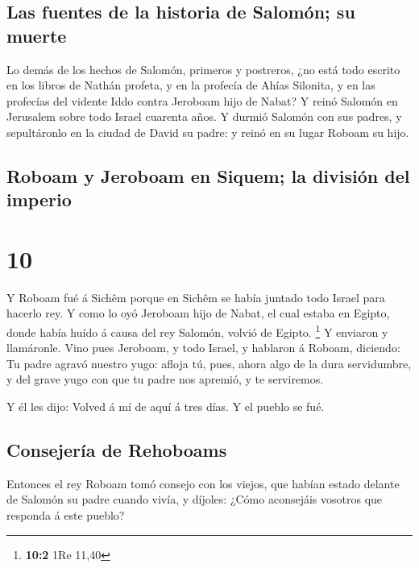 \hypertarget{las-fuentes-de-la-historia-de-salomuxf3n-su-muerte}{%
\subsection{Las fuentes de la historia de Salomón; su
muerte}\label{las-fuentes-de-la-historia-de-salomuxf3n-su-muerte}}

 Lo demás de los hechos de Salomón, primeros y postreros,
¿no está todo escrito en los libros de Nathán profeta, y en la profecía
de Ahías Silonita, y en las profecías del vidente Iddo contra Jeroboam
hijo de Nabat?  Y reinó Salomón en Jerusalem sobre todo
Israel cuarenta años.  Y durmió Salomón con sus padres, y
sepultáronlo en la ciudad de David su padre: y reinó en su lugar Roboam
su hijo.

\hypertarget{roboam-y-jeroboam-en-siquem-la-divisiuxf3n-del-imperio}{%
\subsection{Roboam y Jeroboam en Siquem; la división del
imperio}\label{roboam-y-jeroboam-en-siquem-la-divisiuxf3n-del-imperio}}

\hypertarget{section-9}{%
\section{10}\label{section-9}}

 Y Roboam fué á Sichêm porque en Sichêm se había juntado
todo Israel para hacerlo rey.  Y como lo oyó Jeroboam hijo
de Nabat, el cual estaba en Egipto, donde había huído á causa del rey
Salomón, volvió de Egipto. \footnote{\textbf{10:2} 1Re 11,40}
 Y enviaron y llamáronle. Vino pues Jeroboam, y todo
Israel, y hablaron á Roboam, diciendo:  Tu padre agravó
nuestro yugo: afloja tú, pues, ahora algo de la dura servidumbre, y del
grave yugo con que tu padre nos apremió, y te serviremos.

 Y él les dijo: Volved á mí de aquí á tres días. Y el
pueblo se fué.

\hypertarget{consejeruxeda-de-rehoboams}{%
\subsection{Consejería de Rehoboams}\label{consejeruxeda-de-rehoboams}}

 Entonces el rey Roboam tomó consejo con los viejos, que
habían estado delante de Salomón su padre cuando vivía, y díjoles: ¿Cómo
aconsejáis vosotros que responda á este pueblo?

